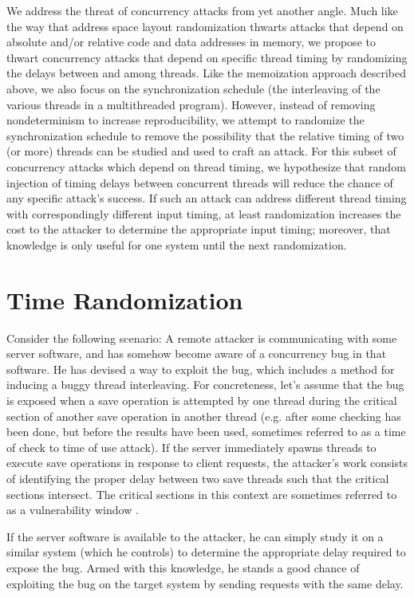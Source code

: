 \documentclass[letterpaper,twocolumn,10pt]{article}
\begin{document}
We address the threat of concurrency attacks from yet another angle.  Much like the way that address space layout randomization thwarts attacks that depend on absolute and/or relative code and data addresses in memory, we propose to thwart concurrency attacks that depend on specific thread timing by randomizing the delays between and among threads.  Like the memoization approach described above, we also focus on the synchronization schedule (the interleaving of the various threads in a multithreaded program).  However, instead of removing nondeterminism to increase reproducibility, we attempt to randomize the synchronization schedule to remove the possibility that the relative timing of two (or more) threads can be studied and used to craft an attack.  For this subset of concurrency attacks which depend on thread timing, we hypothesize that random injection of timing delays between concurrent threads will reduce the chance of any specific attack's success.  If such an attack can address different thread timing with correspondingly different input timing, at least randomization increases the cost to the attacker to determine the appropriate input timing; moreover, that knowledge is only useful for one system until the next randomization.

\section{Time Randomization}
Consider the following scenario: A remote attacker is communicating with some server software, and has somehow become aware of a concurrency bug in that software.  He has devised a way to exploit the bug, which includes a method for inducing a buggy thread interleaving.  For concreteness, let's assume that the bug is exposed when a save operation is attempted by one thread during the critical section of another save operation in another thread (e.g. after some checking has been done, but before the results have been used, sometimes referred to as a time of check to time of use attack).  If the server immediately spawns threads to execute save operations in response to client requests, the attacker's work consists of identifying the proper delay between two save threads such that the critical sections intersect.  The critical sections in this context are sometimes referred to as a vulnerability window \cite{Yang2011}.

If the server software is available to the attacker, he can simply study it on a similar system (which he controls) to determine the appropriate delay required to expose the bug.  Armed with this knowledge, he stands a good chance of exploiting the bug on the target system by sending requests with the same delay.
\end{document}
